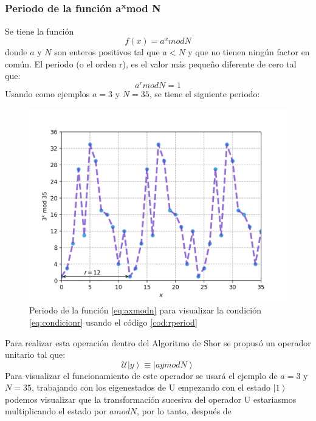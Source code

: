 \subsubsection{Periodo de la función a\textsuperscript{x}mod N}
Se tiene la función \begin{equation}
    f(x)=a^x mod N
    \label{eq:axmodn}
\end{equation}
donde $a$ y $N$ son enteros positivos tal que $a<N$ y que no tienen ningún factor en común. El periodo (o el orden r), es el valor más pequeño 
diferente de cero tal que:
\begin{equation}
    a^r mod N =1
    \label{eq:condicionr}
\end{equation}
Usando como ejemplos $a=3$ y $N=35$, se tiene el siguiente periodo:
\begin{figure}[H]
    \centering
    \includegraphics[scale=0.65]{../Graphics/period.png}
    \caption{Periodo de la función \ref{eq:axmodn} para visualizar la condición \ref{eq:condicionr} usando el código \ref{cod:rperiod}}
    \label{fig:condicionr}
\end{figure}
Para realizar esta operación dentro del Algoritmo de Shor se propusó un operador unitario tal que:
\begin{equation}
    \mathcal{U} \left| y \right\rangle \equiv \left| ay mod N \right\rangle 
    \label{eq:umod}
\end{equation}
Para visualizar el funcionamiento de este operador se usará el ejemplo de $a=3$ y $N=35$, trabajando con los eigenestados de U empezando con el estado 
$\left|1\right\rangle$ podemos visualizar que la transformación sucesiva del operador U estariasmos multiplicando el estado por $amodN$, por lo tanto, después de
